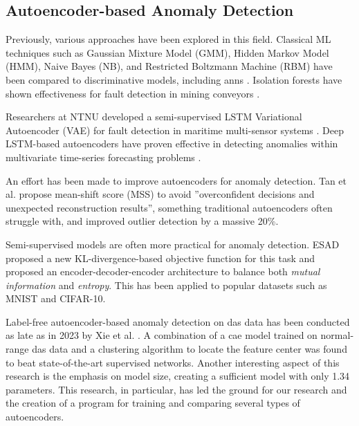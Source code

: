 


\subsection{Autoencoder-based Anomaly Detection}

 Previously, various approaches have been explored in this field. Classical ML techniques such as Gaussian Mixture Model (GMM), Hidden Markov Model (HMM), Naive Bayes (NB), and Restricted Boltzmann Machine (RBM) have been compared to discriminative models, including  \acrshort{ann}s \cite{app7080841}. Isolation forests have shown effectiveness for fault detection in mining conveyors \cite{WIJAYA2022110330}.

Researchers at NTNU developed a semi-supervised LSTM Variational Autoencoder (VAE) for fault detection in maritime multi-sensor systems \cite{9514856}. Deep LSTM-based autoencoders have proven effective in detecting anomalies within multivariate time-series forecasting problems \cite{alaaDeepLstm2019}. 

An effort has been made to improve autoencoders for anomaly detection. Tan et al. \cite{tan2023improving} propose mean-shift score (MSS) to avoid ''overconfident decisions and unexpected reconstruction results'', something traditional autoencoders often struggle with, and improved outlier detection by a massive 20\%. 

Semi-supervised models are often more practical for anomaly detection. ESAD \cite{huang2021esad} proposed a new KL-divergence-based objective function for this task and proposed an encoder-decoder-encoder architecture to balance both \textit{mutual information} and \textit{entropy}. This has been applied to popular datasets such as MNIST and CIFAR-10.

Label-free autoencoder-based anomaly detection on \acrshort{das} data has been conducted as late as in 2023 by Xie et al. \cite{xie2023label}. A combination of a \acrshort{cae} model trained on normal-range \acrshort{das} data and a clustering algorithm to locate the feature center was found to beat state-of-the-art supervised networks. Another interesting aspect of this research is the emphasis on model size, creating a sufficient model with only \qty{1.34}{\si{\kilo}} parameters. This research, in particular, has led the ground for our research and the creation of a program for training and comparing several types of autoencoders. 


